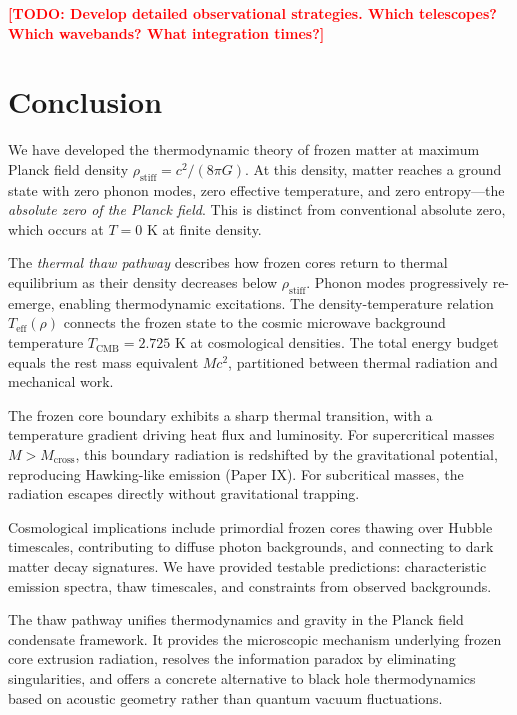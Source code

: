 \documentclass[11pt,a4paper]{article}
\newcommand{\rhostiff}{\ensuremath{\rho_{\mathrm{stiff}}}}
\newcommand{\Teff}{\ensuremath{T_{\mathrm{eff}}}}
\newcommand{\TCMB}{\ensuremath{T_{\mathrm{CMB}}}}
\newcommand{\Mcross}{\ensuremath{M_{\mathrm{cross}}}}
\newcommand{\TODO}[1]{\textcolor{red}{\textbf{[TODO: #1]}}}
\theoremstyle{definition}
\theoremstyle{remark}
\begin{document}
\TODO{Develop detailed observational strategies. Which telescopes? Which wavebands? What integration times?}

\section{Conclusion}
\label{sec:conclusion}

We have developed the thermodynamic theory of frozen matter at maximum Planck field density $\rhostiff = c^2/(8\pi G)$. At this density, matter reaches a ground state with zero phonon modes, zero effective temperature, and zero entropy---the \emph{absolute zero of the Planck field}. This is distinct from conventional absolute zero, which occurs at $T = 0$ K at finite density.

\vspace{0.5em}
\noindent
The \emph{thermal thaw pathway} describes how frozen cores return to thermal equilibrium as their density decreases below $\rhostiff$. Phonon modes progressively re-emerge, enabling thermodynamic excitations. The density-temperature relation $\Teff(\rho)$ connects the frozen state to the cosmic microwave background temperature $\TCMB = 2.725$ K at cosmological densities. The total energy budget equals the rest mass equivalent $Mc^2$, partitioned between thermal radiation and mechanical work.

\vspace{0.5em}
\noindent
The frozen core boundary exhibits a sharp thermal transition, with a temperature gradient driving heat flux and luminosity. For supercritical masses $M > \Mcross$, this boundary radiation is redshifted by the gravitational potential, reproducing Hawking-like emission (Paper IX). For subcritical masses, the radiation escapes directly without gravitational trapping.

\vspace{0.5em}
\noindent
Cosmological implications include primordial frozen cores thawing over Hubble timescales, contributing to diffuse photon backgrounds, and connecting to dark matter decay signatures. We have provided testable predictions: characteristic emission spectra, thaw timescales, and constraints from observed backgrounds.

\vspace{0.5em}
\noindent
The thaw pathway unifies thermodynamics and gravity in the Planck field condensate framework. It provides the microscopic mechanism underlying frozen core extrusion radiation, resolves the information paradox by eliminating singularities, and offers a concrete alternative to black hole thermodynamics based on acoustic geometry rather than quantum vacuum fluctuations.
\end{document}
